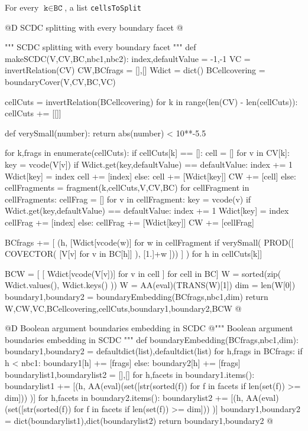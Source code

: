 \documentclass[11pt,oneside]{article}	%
\begin{document}
For every $\texttt{k} \in \texttt{BC}$, a list \texttt{cellsToSplit}

@D SCDC splitting with every boundary facet
@{""" SCDC splitting with every boundary facet """
def makeSCDC(V,CV,BC,nbc1,nbc2):
	index,defaultValue = -1,-1
	VC = invertRelation(CV)
	CW,BCfrags = [],[]
	Wdict = dict()
	BCellcovering = boundaryCover(V,CV,BC,VC)

	cellCuts = invertRelation(BCellcovering)
	for k in range(len(CV) - len(cellCuts)): cellCuts += [[]]
	
	def verySmall(number): return abs(number) < 10**-5.5
	
	for k,frags in enumerate(cellCuts):
		if cellCuts[k] == []:
			cell = []
			for v in CV[k]:
				key = vcode(V[v])
				if Wdict.get(key,defaultValue) == defaultValue:
					index += 1
					Wdict[key] = index
					cell += [index]
				else: 
					cell += [Wdict[key]]
			CW += [cell]
		else:
			cellFragments = fragment(k,cellCuts,V,CV,BC)
			for cellFragment in cellFragments:
				cellFrag = []
				for v in cellFragment:
					key = vcode(v)
					if Wdict.get(key,defaultValue) == defaultValue:
						index += 1
						Wdict[key] = index
						cellFrag += [index]
					else: 
						cellFrag += [Wdict[key]]
				CW += [cellFrag]	
				
				BCfrags += [ (h, [Wdict[vcode(w)] for w in cellFragment if verySmall( 
								PROD([ COVECTOR( [V[v] for v in BC[h]] ), [1.]+w ])) ] )
							 for h in cellCuts[k]]	
	
	BCW = [ [ Wdict[vcode(V[v])] for v in cell ] for cell in BC]
	W = sorted(zip( Wdict.values(), Wdict.keys() ))
	W = AA(eval)(TRANS(W)[1])
	dim = len(W[0])
	boundary1,boundary2 = boundaryEmbedding(BCfrags,nbc1,dim)
	return W,CW,VC,BCellcovering,cellCuts,boundary1,boundary2,BCW
@}

@D Boolean argument boundaries embedding in SCDC
@{""" Boolean argument boundaries embedding in SCDC """
def boundaryEmbedding(BCfrags,nbc1,dim):
	boundary1,boundary2 = defaultdict(list),defaultdict(list)						 
	for h,frags in BCfrags:
		if h < nbc1: boundary1[h] += [frags]
		else: boundary2[h] += [frags]	
	boundarylist1,boundarylist2 = [],[]
	for h,facets in boundary1.items():
		boundarylist1 += [(h, AA(eval)(set([str(sorted(f)) 
							for f in facets if len(set(f)) >= dim])) )]
	for h,facets in boundary2.items():
		boundarylist2 += [(h, AA(eval)(set([str(sorted(f)) 
							for f in facets if len(set(f)) >= dim])) )]
	boundary1,boundary2 = dict(boundarylist1),dict(boundarylist2)
	return boundary1,boundary2
@}
\end{document}
